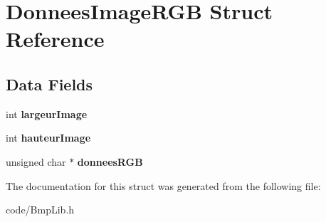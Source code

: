 \hypertarget{structDonneesImageRGB}{}\section{Donnees\+Image\+R\+GB Struct Reference}
\label{structDonneesImageRGB}
\subsection*{Data Fields}
\begin{DoxyCompactItemize}
\item 
int {\bfseries largeur\+Image}\hypertarget{structDonneesImageRGB_a371e9e6a48ebd26478d635b18b8cbce0}{}\label{structDonneesImageRGB_a371e9e6a48ebd26478d635b18b8cbce0}

\item 
int {\bfseries hauteur\+Image}\hypertarget{structDonneesImageRGB_acd30657c28c5afb357a4268771feed53}{}\label{structDonneesImageRGB_acd30657c28c5afb357a4268771feed53}

\item 
unsigned char $\ast$ {\bfseries donnees\+R\+GB}\hypertarget{structDonneesImageRGB_a10941ee0696f9b8b564f93cc5603cae1}{}\label{structDonneesImageRGB_a10941ee0696f9b8b564f93cc5603cae1}

\end{DoxyCompactItemize}


The documentation for this struct was generated from the following file\+:\begin{DoxyCompactItemize}
\item 
code/Bmp\+Lib.\+h\end{DoxyCompactItemize}
